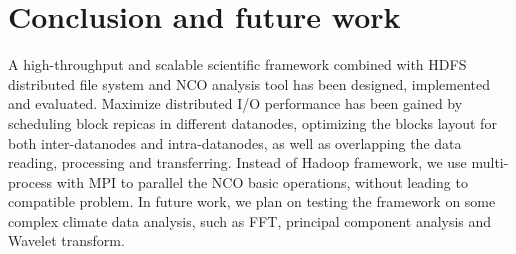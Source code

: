 \documentclass[preprint,12pt]{elsarticle}
\begin{document}
\section{Conclusion and future work}
A high-throughput and scalable scientific framework combined with HDFS distributed file system and NCO analysis tool has been designed, 
implemented and evaluated. Maximize distributed I/O performance has been gained by scheduling block repicas in different datanodes, 
optimizing the blocks layout for both inter-datanodes and intra-datanodes,  as well as overlapping the data reading, processing and 
transferring. Instead of Hadoop framework, we use multi-process with MPI to parallel the NCO basic operations, without leading to compatible 
problem. In future work, we plan on testing the framework on some complex climate data analysis, such as FFT, principal component analysis 
and Wavelet transform.

	







\end{document}
